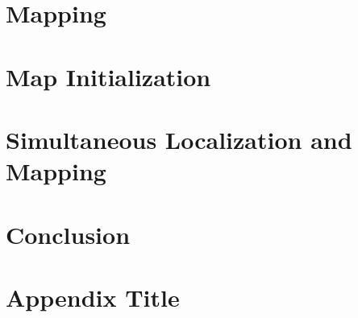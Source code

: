 \documentclass{eplmastersthesis}
\begin{document}
\chapter{Mapping}


\chapter{Map Initialization}


\chapter{Simultaneous Localization and Mapping}




\chapter{Conclusion}


\printbibliography

\appendix
\chapter{Appendix Title}


\backcoverpage
\end{document}
